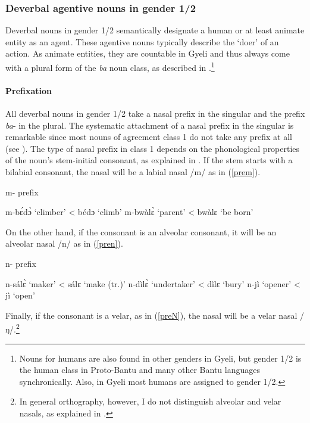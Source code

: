 \subsubsection{Deverbal agentive nouns in gender 1/2}
\label{sec:NOM12}

Deverbal nouns in gender 1/2 semantically designate a human or at least animate entity as an agent.
These agentive nouns typically describe the `doer' of an action. As animate entities, they are countable in Gyeli and thus always come with a plural form of the {\itshape ba} noun class, as described in .\footnote{Nouns for humans are also found in other genders in Gyeli, but gender 1/2 is the human class in Proto-Bantu and many other Bantu languages synchronically. Also, in Gyeli most humans are assigned to gender 1/2.}

\paragraph{Prefixation} All deverbal nouns in gender 1/2 take a nasal prefix in the singular and the prefix {\itshape ba}- in the plural. The systematic attachment of a nasal prefix in the singular is remarkable since most nouns of agreement class 1 do not take any prefix at all (see ).
The type of nasal prefix in class 1 depends on the phonological properties of the noun's stem-initial consonant, as explained in . If the stem starts with a bilabial consonant, the nasal will be a labial nasal /m/ as in (\ref{prem}).  


\begin{exe}
\ex\label{prem} m- prefix
\begin{xlist}
\ex m-bɛ́dɔ̀ `climber' < bédɔ `climb'
\ex m-bwàlɛ̀  `parent' <  bwàlɛ `be born'
\end{xlist}
\end{exe}

\noindent On the other hand, if the consonant is an alveolar consonant, it will be an alveolar nasal /n/ as in (\ref{pren}).

\begin{exe}
\ex\label{pren} n- prefix
\begin{xlist}
\ex n-sálɛ̀ `maker' < sálɛ `make (tr.)'
\ex n-dìlɛ̀ `undertaker' <  dìlɛ `bury'
\ex  n-jì `opener' < jì `open'
\end{xlist}
\end{exe}

\noindent Finally, if the consonant is a velar, as in (\ref{preN}), the nasal will be a velar nasal /ŋ/.\footnote{In general orthography, however, I do not distinguish alveolar and velar nasals, as explained in .}

